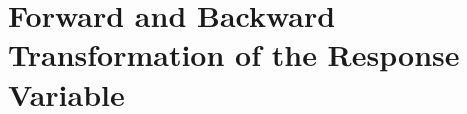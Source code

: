 \documentclass[article]{jss}
\begin{document}
\section{Forward and Backward Transformation of the Response Variable}
\end{document}
